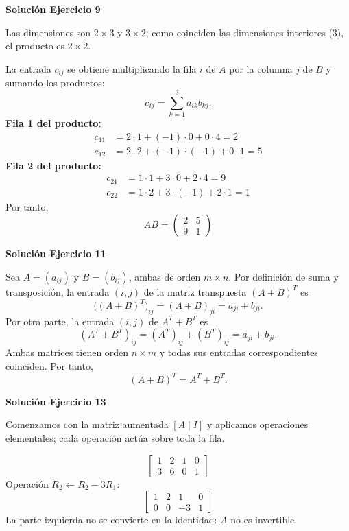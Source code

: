 \documentclass[12pt]{article}
\begin{document}
\par\bigskip\noindent\textbf{Solución Ejercicio 9}\par\nobreak
Las dimensiones son $2\times3$ y $3\times2$; como coinciden las dimensiones interiores (3), el producto es $2\times2$.

La entrada $c_{ij}$ se obtiene multiplicando la fila $i$ de $A$ por la columna $j$ de $B$ y sumando los productos:
\[
c_{ij}=\sum_{k=1}^{3} a_{ik}b_{kj}.
\]
\textbf{Fila 1 del producto:}
\[
\begin{aligned}c_{11}&=2\cdot 1+(-1)\cdot 0+0\cdot 4=2\\c_{12}&=2\cdot 2+(-1)\cdot (-1)+0\cdot 1=5\end{aligned}
\]
\textbf{Fila 2 del producto:}
\[
\begin{aligned}c_{21}&=1\cdot 1+3\cdot 0+2\cdot 4=9\\c_{22}&=1\cdot 2+3\cdot (-1)+2\cdot 1=1\end{aligned}
\]
Por tanto,
\[
\boxed{AB=\begin{pmatrix}2&5\\9&1\end{pmatrix}}
\]

\par\bigskip\noindent\textbf{Solución Ejercicio 11}\par\nobreak
Sea $A=(a_{ij})$ y $B=(b_{ij})$, ambas de orden $m\times n$. Por definición de suma y transposición, la entrada $(i,j)$ de la matriz transpuesta $(A+B)^T$ es
\[
\bigl((A+B)^T\bigr)_{ij}=(A+B)_{ji}=a_{ji}+b_{ji}.
\]
Por otra parte, la entrada $(i,j)$ de $A^T+B^T$ es
\[
(A^T+B^T)_{ij}=(A^T)_{ij}+(B^T)_{ij}=a_{ji}+b_{ji}.
\]
Ambas matrices tienen orden $n\times m$ y todas sus entradas correspondientes coinciden. Por tanto,
\[
\boxed{(A+B)^T=A^T+B^T}.
\]

\par\bigskip\noindent\textbf{Solución Ejercicio 13}\par\nobreak
Comenzamos con la matriz aumentada $[A\mid I]$ y aplicamos operaciones elementales; cada operación actúa sobre toda la fila.

\[
\left[\begin{array}{rr|rr}1&2&1&0\\3&6&0&1\end{array}\right]
\]
Operación $R_{2}\leftarrow R_{2}-3R_{1}$:
\[
\left[\begin{array}{rr|rr}1&2&1&0\\0&0&-3&1\end{array}\right]
\]
La parte izquierda no se convierte en la identidad: $A$ no es invertible.
\end{document}
